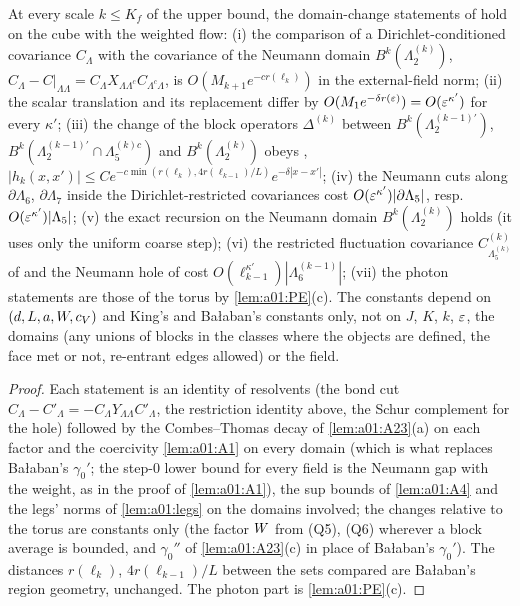 \begin{proposition}\label{prop:a01:dGD}
At every scale $k\le K_f$ of the upper bound, the domain-change statements of \cite[(2.18)--(2.50), (2.108)--(2.115)]{Ba2} hold on the cube with the weighted flow: (i) the comparison of a Dirichlet-conditioned covariance $C_\Lambda$ with the covariance of the Neumann domain $B^k(\Lambda_2^{(k)})$, $C_\Lambda-C|_{\Lambda\Lambda}=C_\Lambda X_{\Lambda\Lambda^c}C_{\Lambda^c\Lambda}$, is $O(M_{k+1}e^{-cr(\ell_k)})$ in the external-field norm; (ii) the scalar translation \cite[(2.23)]{Ba2} and its replacement \cite[(2.25)]{Ba2} differ by $O(M_1e^{-\delta r(\varepsilon)})=O(\varepsilon^{\kappa'})$ for every $\kappa'$; (iii) the change \cite[(2.108)]{Ba2} of the block operators $\Delta^{(k)}$ between $B^k(\Lambda_2^{(k-1)\prime})$, $B^k(\Lambda_2^{(k-1)\prime}\cap\Lambda_5^{(k)c})$ and $B^k(\Lambda_2^{(k)})$ obeys \cite[(2.109)]{Ba2}, $|h_k(x,x')|\le Ce^{-c\min(r(\ell_k),4r(\ell_{k-1})/L)}e^{-\delta|x-x'|}$; (iv) the Neumann cuts along $\partial\Lambda_6$, $\partial\Lambda_7$ inside the Dirichlet-restricted covariances \cite[(2.38)--(2.40)]{Ba2} cost $O(\varepsilon^{\kappa'})|\partial\Lambda_5|$, resp.\ $O(\varepsilon^{\kappa'})|\Lambda_5|$; (v) the exact recursion \cite[(2.41)]{Ba1} on the Neumann domain $B^k(\Lambda_2^{(k)})$ holds (it uses only the uniform coarse step); (vi) the restricted fluctuation covariance $C^{(k)}_{\Lambda_5^{(k)}}$ of \cite[(2.115)]{Ba2} and the Neumann hole of \cite[(2.46)--(2.47)]{Ba2} cost $O(\ell_{k-1}^{\kappa'})|\Lambda_6^{(k-1)}|$; (vii) the photon statements are those of the torus by \cref{lem:a01:PE}(c). The constants depend on $(d,L,a,W,c_V)$ and King's and Ba{\l}aban's constants only, not on $J$, $K$, $k$, $\varepsilon$, the domains (any unions of blocks in the classes where the objects are defined, the face met or not, re-entrant edges allowed) or the field.
\end{proposition}
\begin{proof}
Each statement is an identity of resolvents (the bond cut $C_\Lambda-C'_\Lambda=-C_\Lambda Y_{\Lambda\Lambda}C'_\Lambda$, the restriction identity above, the Schur complement for the hole) followed by the Combes--Thomas decay of \cref{lem:a01:A23}(a) on each factor and the coercivity \cref{lem:a01:A1} on every domain (which is what replaces Ba{\l}aban's $\gamma_0'$; the step-$0$ lower bound for every field is the Neumann gap with the weight, as in the proof of \cref{lem:a01:A1}), the sup bounds of \cref{lem:a01:A4} and the legs' norms of \cref{lem:a01:legs} on the domains involved; the changes relative to the torus are constants only (the factor $W$ from (Q5), (Q6) wherever a block average is bounded, and $\gamma_0''$ of \cref{lem:a01:A23}(c) in place of Ba{\l}aban's $\gamma_0'$). The distances $r(\ell_k)$, $4r(\ell_{k-1})/L$ between the sets compared are Ba{\l}aban's region geometry, unchanged. The photon part is \cref{lem:a01:PE}(c).
\end{proof}

